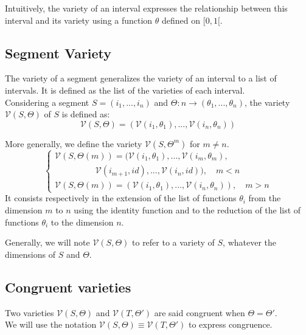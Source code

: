 \documentclass[letterpaper, 12pt]{article}
\newcommand{\variete}			{\ensuremath{\mathcal{V}}}
\newcommand{\identite}		{\ensuremath{id}}
\newcommand{\semblable}		{\ensuremath{\equiv}}
\begin{document}
Intuitively, the variety of an interval expresses the relationship between this interval and its variety using a function $\theta$ defined on $[0, 1[$.

\subsection{Segment Variety}\label{sub:segvariete}

The variety of a segment generalizes the variety of an interval to a list of intervals.
It is defined as the list of the varieties of each interval.\\
Considering a segment $S = (i_1, ... , i_n)$ and $\Theta : n \to (\theta_1, ... , \theta_n)$, the variety $\variete(S, \Theta)$ of $S$ is defined as:
\begin{equation}
 \variete(S, \Theta) = (\variete(i_1,\theta_1), ... , \variete(i_n, \theta_n))
\end{equation}

More generally, we define the variety $\variete(S, \Theta^m)$ for $m \neq n$.
\begin{equation}
\begin{cases}
\variete(S, \Theta(m)) = (\variete(i_1,\theta_1), ... , \variete(i_m, \theta_m), \\
\hspace{2cm} \variete(i_{m+1}, \identite), ..., \variete(i_n, \identite))
, \quad m < n \\
\variete(S, \Theta(m)) = (\variete(i_1,\theta_1), ... , \variete(i_n, \theta_n)), \quad m > n
\end{cases}
\end{equation}
It consists respectively in the extension of the list of functions $\theta_i$ from the dimension $m$ to $n$ using the identity function and to the reduction of the list of functions $\theta_i$ to the dimension $n$.

Generally, we will note  $\variete(S, \Theta)$ to refer to a variety of $S$, whatever the dimensions of $S$ and $\Theta$.


\subsection{Congruent varieties}\label{sub:simvariete}

Two varieties $\variete(S, \Theta)$ and $\variete(T, \Theta')$  are said congruent when $\Theta = \Theta'$.\\ 
We will use the notation $\variete(S, \Theta) \semblable \variete(T, \Theta')$ to express congruence.
\end{document}
